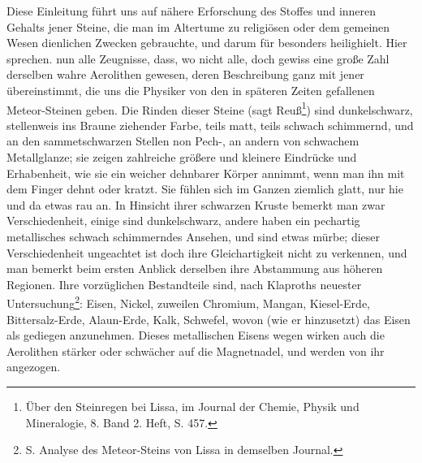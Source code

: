 \documentclass[a4paper, 11pt, oneside, polutonikogreek, german]{article}
\begin{document}
Diese Einleitung führt uns auf nähere Erforschung des Stoffes und inneren Gehalts jener Steine, die man im Altertume zu religiösen oder dem gemeinen Wesen dienlichen Zwecken gebrauchte, und darum für besonders heilighielt. Hier sprechen. nun alle Zeugnisse, dass, wo nicht alle, doch gewiss eine große Zahl derselben wahre Aerolithen gewesen, deren Beschreibung ganz mit jener übereinstimmt, die uns die Physiker von den in späteren Zeiten gefallenen Meteor-Steinen geben. Die Rinden dieser Steine (sagt Reuß\footnote{Über den Steinregen bei Lissa, im Journal der Chemie, Physik und Mineralogie, 8. Band 2. Heft, S. 457.}) sind dunkelschwarz, stellenweis ins Braune ziehender Farbe, teils matt, teils schwach schimmernd, und an den sammetschwarzen Stellen non Pech-, an andern von schwachem Metallglanze; sie zeigen zahlreiche größere und kleinere Eindrücke und Erhabenheit, wie sie ein weicher dehnbarer Körper annimmt, wenn man ihn mit dem Finger dehnt oder kratzt. Sie fühlen sich im Ganzen ziemlich glatt, nur hie und da etwas rau an. In Hinsicht ihrer schwarzen Kruste bemerkt man zwar Verschiedenheit, einige sind dunkelschwarz, andere haben ein pechartig metallisches schwach schimmerndes Ansehen, und sind etwas mürbe; dieser Verschiedenheit ungeachtet ist doch ihre Gleichartigkeit nicht zu verkennen, und man bemerkt beim ersten Anblick derselben ihre Abstammung aus höheren Regionen. Ihre vorzüglichen Bestandteile sind, nach Klaproths neuester Untersuchung\footnote{S. Analyse des Meteor-Steins von Lissa in demselben Journal.}: Eisen, Nickel, zuweilen Chromium, Mangan, Kiesel-Erde, Bittersalz-Erde, Alaun-Erde, Kalk, Schwefel, wovon (wie er hinzusetzt) das Eisen als gediegen anzunehmen. Dieses metallischen Eisens wegen wirken auch die Aerolithen stärker oder schwächer auf die Magnetnadel, und werden von ihr angezogen.
\end{document}
